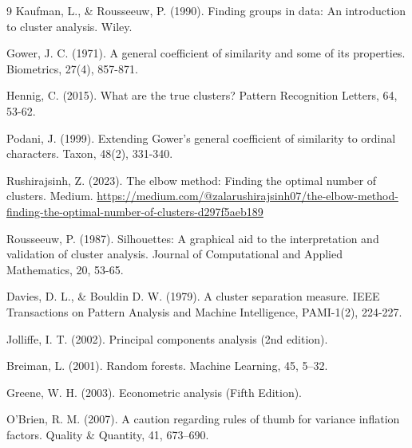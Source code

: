 \documentclass[a4paper, 12pt, twoside]{report}  %
\begin{document}
\begin{thebibliography}{9}
Kaufman, L., \& Rousseeuw, P. (1990). Finding groups in data: An introduction to cluster analysis. Wiley.

Gower, J. C. (1971). A general coefficient of similarity and some of its properties. Biometrics, 27(4), 857-871.

Hennig, C. (2015). What are the true clusters? Pattern Recognition Letters, 64, 53-62.

Podani, J. (1999). Extending Gower's general coefficient of similarity to ordinal characters. Taxon, 48(2), 331-340.

Rushirajsinh, Z. (2023). The elbow method: Finding the optimal number of clusters. Medium. \url{https://medium.com/@zalarushirajsinh07/the-elbow-method-finding-the-optimal-number-of-clusters-d297f5aeb189}

Rousseeuw, P. (1987). Silhouettes: A graphical aid to the interpretation and validation of cluster analysis. Journal of Computational and Applied Mathematics, 20, 53-65.

Davies, D. L., \& Bouldin D. W. (1979). A cluster separation measure. IEEE Transactions on Pattern Analysis and Machine Intelligence, PAMI-1(2), 224-227.

Jolliffe, I. T. (2002). Principal components analysis (2nd edition).

Breiman, L. (2001). Random forests. Machine Learning, 45, 5–32.

Greene, W. H. (2003). Econometric analysis (Fifth Edition).

O’Brien, R. M. (2007). A caution regarding rules of thumb for variance inflation factors. Quality \& Quantity, 41, 673–690.


\end{thebibliography}


\makeatletter
\renewcommand*{\theappendixsection}{\AlphAlph{\value{appendixsection}}}
\makeatother

\newcommand{\appendixsection}[2][]{%
  \refstepcounter{appendixsection}%
  \section*{\theappendixsection. #2}%
  \addcontentsline{toc}{section}{\theappendixsection. #2}%
  \ifx&#1&%
  \else%
    \label{#1}%
  \fi%
}
\end{document}
